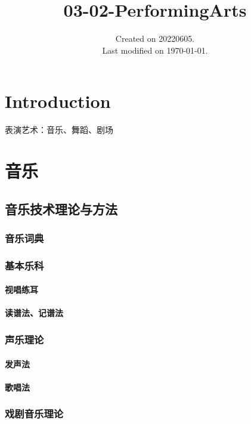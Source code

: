 \documentclass[UTF8]{../RepresentationUniverse}
\begin{document}
\title{03-02-PerformingArts}
\date{Created on 20220605.\\   Last modified on \today.}
\maketitle
\tableofcontents


\chapter{Introduction}

表演艺术：音乐、舞蹈、剧场

\chapter{音乐}





\section{音乐技术理论与方法}
    \subsection{音乐词典}

    \subsection{基本乐科}
        \subsubsection{视唱练耳}
        \subsubsection{读谱法、记谱法}
    \subsection{声乐理论}
        \subsubsection{发声法}
        \subsubsection{歌唱法}
    \subsection{戏剧音乐理论}
\end{document}
